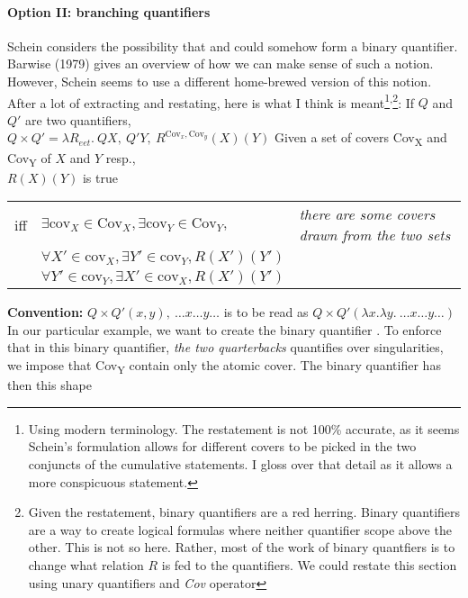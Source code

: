 \documentclass[english]{article}
\begin{document}
\paragraph{Option II: branching quantifiers} Schein considers the possibility that  and  could somehow form a binary quantifier. Barwise (1979) gives an overview of how we can make sense of such a notion. However, Schein seems to use a different home-brewed version of this notion. After a lot of extracting and restating, here is what I think is meant\footnote{Using modern terminology. The restatement is not 100\% accurate, as it seems Schein's formulation allows for different covers to be picked in the two conjuncts of the cumulative statements. I gloss over that detail as it allows a more conspicuous statement.}\textsuperscript{,}\footnote{Given the restatement, binary quantifiers are a red herring. Binary quantifiers are a way to create logical formulas where neither quantifier scope above the other. This is not so here. Rather, most of the work of binary quantfiers is to change what relation $R$ is fed to the quantifiers. We could restate this section using unary quantifiers and \emph{Cov} operator}:
\pex
\a 
If $Q$ and $Q'$ are two quantifiers,\\
$Q\times Q' = \lambda R_{eet}.\  Q X,\ Q' Y,\
R^{\text{Cov}_x,\text{Cov}_y}(X)(Y)
$
\a Given a set of covers Cov\textsubscript{X} and Cov\textsubscript{Y} of $X$ and $Y$ resp., \\
$R(X)(Y)$ is true \\
\setlength{\tabcolsep}{3pt}
\begin{tabular}{lll}%
iff& $\exists \text{cov}_X\in \text{Cov}_{X}, \exists \text{cov}_Y\in \text{Cov}_{Y},$& \emph{there are some covers drawn from the two sets}\\
&$\forall X'\in \text{cov}_{X}, \exists Y'\in \text{cov}_{Y}, R(X')(Y')$&\\
&$\forall Y'\in \text{cov}_{Y}, \exists X'\in \text{cov}_{X}, R(X')(Y')$&\\

\end{tabular}
\a \textbf{Convention:} $Q\times Q' (x,y),\ \ldots x \ldots y \ldots$ is to be read as $Q\times Q'\left( \lambda x. \lambda y.\ \ldots x \ldots y \ldots\right) $ 
\xe
%
In our particular example, we want to create the binary quantifier . To enforce that in this binary quantifier, \emph{the two quarterbacks} quantifies over singularities, we impose that Cov\textsubscript{Y} contain only the atomic cover. The binary quantifier has then this shape
\end{document}
